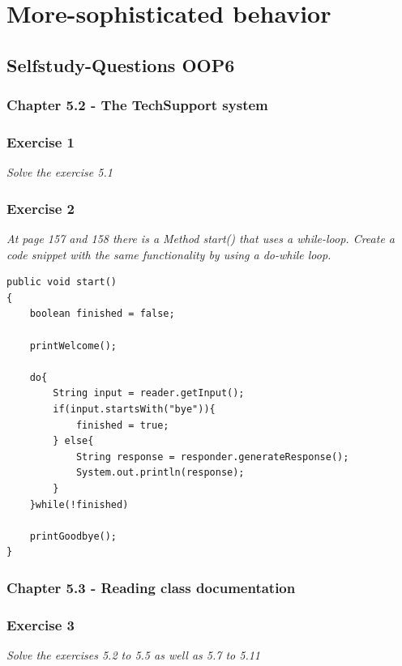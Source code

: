 \section{More-sophisticated behavior}

\subsection{Selfstudy-Questions OOP6}

\subsubsection{Chapter 5.2 - The TechSupport system}

\subsubsection*{Exercise 1}
\textit{Solve the exercise 5.1}\\



\subsubsection*{Exercise 2}
\textit{At page 157 and 158 there is a Method start() that uses a 
while-loop. Create a code snippet with the same functionality by using a
do-while loop.}\\

\begin{lstlisting}
public void start()
{
	boolean finished = false;

	printWelcome();

	do{
		String input = reader.getInput();
		if(input.startsWith("bye")){
			finished = true;
		} else{
			String response = responder.generateResponse();
			System.out.println(response);
		}
	}while(!finished)
	
	printGoodbye();
}
\end{lstlisting}

\subsubsection{Chapter 5.3 - Reading class documentation}

\subsubsection*{Exercise 3}
\textit{Solve the exercises 5.2 to 5.5 as well as 5.7 to 5.11}\\

